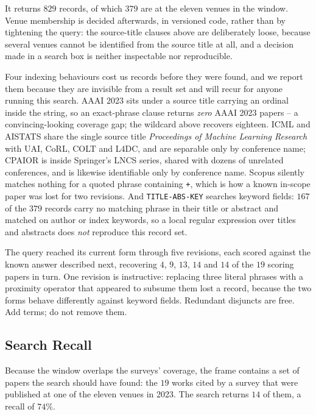 It returns \(829\) records, of which \(379\) are at the eleven venues in the window. Venue membership
is decided afterwards, in versioned code, rather than by tightening the query: the source-title
clauses above are deliberately loose, because several venues cannot be identified from the source
title at all, and a decision made in a search box is neither inspectable nor reproducible.

Four indexing behaviours cost us records before they were found, and we report them because they are
invisible from a result set and will recur for anyone running this search. AAAI 2023 sits under a
source title carrying an ordinal inside the string, so an exact-phrase clause returns \emph{zero}
AAAI 2023 papers -- a convincing-looking coverage gap; the wildcard above recovers eighteen. ICML
and AISTATS share the single source title \emph{Proceedings of Machine Learning Research} with UAI,
CoRL, COLT and L4DC, and are separable only by conference name; CPAIOR is inside Springer's LNCS
series, shared with dozens of unrelated conferences, and is likewise identifiable only by conference
name. Scopus silently matches nothing for a quoted phrase containing \texttt{+}, which is how a
known in-scope paper was lost for two revisions. And \texttt{TITLE-ABS-KEY} searches keyword fields:
\(167\) of the \(379\) records carry no matching phrase in their title or abstract and matched on
author or index keywords, so a local regular expression over titles and abstracts does \emph{not}
reproduce this record set.

The query reached its current form through five revisions, each scored against the known answer
described next, recovering \(4\), \(9\), \(13\), \(14\) and \(14\) of the \(19\) scoring papers in
turn. One revision is instructive: replacing three literal phrases with a proximity operator that
appeared to subsume them lost a record, because the two forms behave differently against keyword
fields. Redundant disjuncts are free. Add terms; do not remove them.

\subsection{Search Recall}

Because the window overlaps the surveys' coverage, the frame contains a set of papers the search
should have found: the \(19\) works cited by a survey that were published at one of the eleven
venues in 2023. The search returns \(14\) of them, a recall of \(74\%\).

